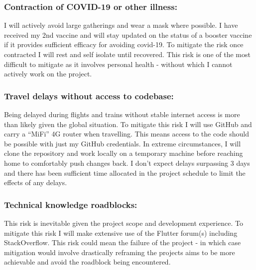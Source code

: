 \subsubsection{Contraction of COVID-19 or other illness:}
\label{risk:mitigation-covid}
\vspace{-2mm}
I will actively avoid large gatherings and wear a mask where possible. I have received my 2nd vaccine and will
stay updated on the status of a booster vaccine if it provides sufficient efficacy
for avoiding covid-19. To mitigate the risk once contracted I will rest
and self isolate until recovered. This risk is one of the most difficult to mitigate as 
it involves personal health - without which I cannot actively work on the project.

\subsubsection{Travel delays without access to codebase:}
\label{risk:mitigation-travel}
\vspace{-2mm}
Being delayed during flights and trains without stable internet access is more than likely given
the global situation. To mitigate this risk I will use GitHub and carry a ``MiFi'' 4G router when travelling.
This means access to the code should be possible with just my GitHub credentials. In extreme circumstances,
I will clone the repository and work locally on a temporary machine before reaching home to comfortably push changes back.
I don't expect delays surpassing 3 days and there has been sufficient time allocated in the project schedule to 
limit the effects of any delays.

\subsubsection{Technical knowledge roadblocks:}
\label{risk:mitigation-roadblocks}
\vspace{-2mm}
This risk is inevitable given the project scope and development experience.
To mitigate this risk I will make extensive use of the Flutter forum(s) including
StackOverflow. This risk could mean the failure of the project - in which case
mitigation would involve drastically reframing the projects aims to be more achievable and avoid
the roadblock being encountered.

